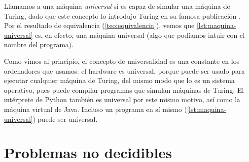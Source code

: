 Llamamos a una máquina \emph{universal} si es capaz de simular una máquina de Turing, dado que este concepto lo introdujo Turing en su famosa publicación \cite{Turing1937}. Por el resultado de equivalencia (\cref{teo:equivalencia}), vemos que \cref{lst:maquina-universal} es, en efecto, una máquina universal (algo que podíamos intuir con el nombre del programa).

Como vimos al principio, el concepto de universalidad es una constante en los ordenadores que usamos: el hardware es universal, porque puede ser usado para ejecutar cualquier máquina de Turing, del mismo modo que lo es un sistema operativo, pues puede compilar programas que simulan máquinas de Turing. El intérprete de Python también es universal por este mismo motivo, así como la máquina virtual de Java. Incluso un programa en sí mismo (\cref{lst:maquina-universal}) puede ser universal.

\section{Problemas no decidibles}\label{sec:problemas-no-decidibles}

